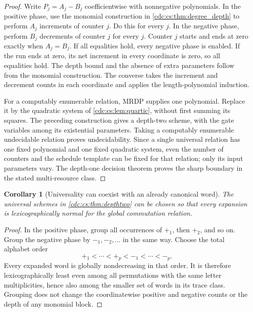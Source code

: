\documentclass[11pt,a4paper]{article}
\newtheorem{corollary}[corollary]{Corollary}
\theoremstyle{definition}
\theoremstyle{remark}
\begin{document}
\begin{proof}
Write $P_j=A_j-B_j$ coefficientwise with nonnegative polynomials. In the
positive phase, use the monomial construction in
\cref{cdc:cs:thm:degree_depth} to perform $A_j$ increments of counter $j$. Do this
for every $j$. In the negative phase, perform $B_j$ decrements of counter $j$
for every $j$. Counter $j$ starts and ends at zero exactly when $A_j=B_j$.
If all equalities hold, every negative phase is enabled. If the run ends at
zero, its net increment in every coordinate is zero, so all equalities hold.
The depth bound and the absence of extra parameters follow from the monomial
construction. The converse takes the increment and decrement counts in each
coordinate and applies the length-polynomial induction.

For a computably enumerable relation, MRDP supplies one polynomial. Replace
it by the quadratic system of \cref{cdc:cs:lem:quartic}, without first summing its
squares. The preceding construction gives a depth-two scheme, with the gate
variables among its existential parameters. Taking a computably enumerable
undecidable relation proves undecidability. Since a single universal relation
has one fixed polynomial and one fixed quadratic system, even the number of
counters and the schedule template can be fixed for that relation; only its
input parameters vary. The depth-one decision theorem proves the sharp
boundary in the stated multi-resource class.
\end{proof}

\begin{corollary}[Universality can coexist with an already canonical word]
The universal schemes in \cref{cdc:cs:thm:depthtwo} can be chosen so that every
expansion is lexicographically normal for the global commutation relation.
\end{corollary}

\begin{proof}
In the positive phase, group all occurrences of $+_1$, then $+_2$, and so on.
Group the negative phase by $-_1,-_2,\ldots$ in the same way. Choose the total
alphabet order
\[
+_1<\cdots<+_p<-_1<\cdots<-_p.
\]
Every expanded word is globally nondecreasing in that order. It is therefore
lexicographically least even among all permutations with the same letter
multiplicities, hence also among the smaller set of words in its trace class.
Grouping does not change the coordinatewise positive and negative counts or
the depth of any monomial block.
\end{proof}
\end{document}
